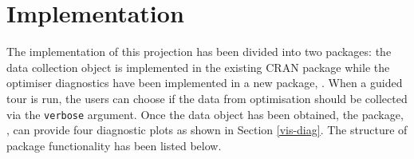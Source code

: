 \hypertarget{implementation}{%
\section{Implementation}\label{implementation}}

The implementation of this projection has been divided into two
packages: the data collection object is implemented in the existing CRAN
package  \citep{tourr} while the optimiser diagnostics
have been implemented in a new package, . When a guided tour
is run, the users can choose if the data from optimisation should be
collected via the \texttt{verbose} argument. Once the data object has
been obtained, the package, , can provide four diagnostic
plots as shown in Section \ref{vis-diag}. The structure of package
functionality has been listed below.

